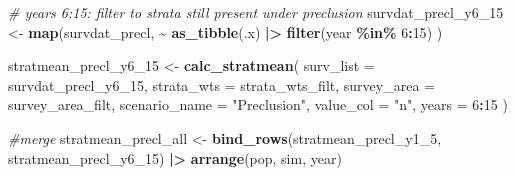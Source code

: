 \documentclass[
]{article}
\newenvironment{Shaded}{\begin{snugshade}}{\end{snugshade}}
\newcommand{\AttributeTok}[1]{\textcolor[rgb]{0.13,0.29,0.53}{#1}}
\newcommand{\CommentTok}[1]{\textcolor[rgb]{0.56,0.35,0.01}{\textit{#1}}}
\newcommand{\DecValTok}[1]{\textcolor[rgb]{0.00,0.00,0.81}{#1}}
\newcommand{\FunctionTok}[1]{\textcolor[rgb]{0.13,0.29,0.53}{\textbf{#1}}}
\newcommand{\NormalTok}[1]{#1}
\newcommand{\OtherTok}[1]{\textcolor[rgb]{0.56,0.35,0.01}{#1}}
\newcommand{\SpecialCharTok}[1]{\textcolor[rgb]{0.81,0.36,0.00}{\textbf{#1}}}
\newcommand{\StringTok}[1]{\textcolor[rgb]{0.31,0.60,0.02}{#1}}
\begin{document}
\begin{Shaded}
\begin{Highlighting}[]
\CommentTok{\# years 6:15: filter to strata still present under preclusion}
\NormalTok{survdat\_precl\_y6\_15 }\OtherTok{\textless{}{-}} \FunctionTok{map}\NormalTok{(survdat\_precl, }\SpecialCharTok{\textasciitilde{}}
  \FunctionTok{as\_tibble}\NormalTok{(.x) }\SpecialCharTok{|\textgreater{}}
    \FunctionTok{filter}\NormalTok{(year }\SpecialCharTok{\%in\%} \DecValTok{6}\SpecialCharTok{:}\DecValTok{15}\NormalTok{) }
\NormalTok{)}

\NormalTok{stratmean\_precl\_y6\_15 }\OtherTok{\textless{}{-}} \FunctionTok{calc\_stratmean}\NormalTok{(}
  \AttributeTok{surv\_list     =}\NormalTok{ survdat\_precl\_y6\_15,}
  \AttributeTok{strata\_wts    =}\NormalTok{ strata\_wts\_filt,}
  \AttributeTok{survey\_area   =}\NormalTok{ survey\_area\_filt,}
  \AttributeTok{scenario\_name =} \StringTok{"Preclusion"}\NormalTok{,}
  \AttributeTok{value\_col     =} \StringTok{"n"}\NormalTok{,}
  \AttributeTok{years         =} \DecValTok{6}\SpecialCharTok{:}\DecValTok{15}
\NormalTok{)}

\CommentTok{\#merge }
\NormalTok{stratmean\_precl\_all }\OtherTok{\textless{}{-}} \FunctionTok{bind\_rows}\NormalTok{(stratmean\_precl\_y1\_5, stratmean\_precl\_y6\_15) }\SpecialCharTok{|\textgreater{}}
  \FunctionTok{arrange}\NormalTok{(pop, sim, year)}



\end{Highlighting}
\end{Shaded}
\end{document}
